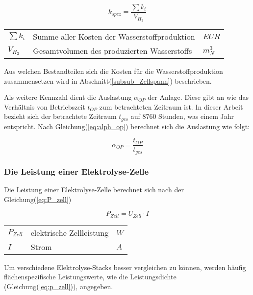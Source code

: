 \documentclass[onecolumn,10pt,titlepage]{article}
\begin{document}
			\begin{equation}
			\label{eq:k_spez}
			k_{spez} = \frac{\sum{k_i}}{V_{H_2}}
			\end{equation}
			
			\begin{table}[H]
				\begin{tabular*}{\textwidth}{lll}
					$\sum{k_i}$&Summe aller Kosten der Wasserstoffproduktion&$EUR$\\
					$V_{H_2}$&Gesamtvolumen des produzierten Wasserstoffs&$m^3_N$\\
				\end{tabular*}
			\end{table}
			
			Aus welchen Bestandteilen sich die Kosten für die Wasserstoffproduktion zusammensetzen wird in Abschnitt(\ref{subsub_Zellspann}) beschrieben.
			
			Als weitere Kennzahl dient die Auslastung $\alpha_{OP}$ der Anlage. Diese gibt an wie das Verhältnis von Betriebszeit $t_{OP}$ zum betrachteten Zeitraum ist. In dieser Arbeit bezieht sich der betrachtete Zeitraum $t_{ges}$ auf 8760 Stunden, was einem Jahr entspricht. Nach Gleichung(\ref{eq:alph_op}) berechnet sich die Auslastung wie folgt:
			
			\begin{equation}
			\label{eq:alph_op}
			\alpha_{OP} = \frac{t_{OP}}{t_{ges}}
			\end{equation}
			
			\subsubsection*{Die Leistung einer Elektrolyse-Zelle}
			Die Leistung einer Elektrolyse-Zelle berechnet sich nach der Gleichung(\ref{eq:P_zell})
			
			\begin{equation}
			\label{eq:P_zell}
			P_{Zell} = U_{Zell}\cdot I
			\end{equation}
			
			\begin{table}[H]
				\begin{tabular*}{\textwidth}{lll}
					$P_{Zell}$&elektrische Zellleistung&$W$\\
					$I$&Strom&$A$\\
				\end{tabular*}
			\end{table}
			
			
			Um verschiedene Elektrolyse-Stacks besser vergleichen zu können, werden häufig flächenspezifische Leistungswerte, wie die Leistungsdichte (Gleichung(\ref{eq:p_zell})), angegeben.\cite{Klein.2013} 
			
\end{document}
